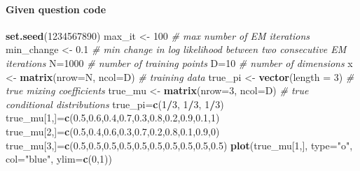 \documentclass[]{article}
\newenvironment{Shaded}{\begin{snugshade}}{\end{snugshade}}
\newcommand{\KeywordTok}[1]{\textcolor[rgb]{0.13,0.29,0.53}{\textbf{#1}}}
\newcommand{\DataTypeTok}[1]{\textcolor[rgb]{0.13,0.29,0.53}{#1}}
\newcommand{\DecValTok}[1]{\textcolor[rgb]{0.00,0.00,0.81}{#1}}
\newcommand{\FloatTok}[1]{\textcolor[rgb]{0.00,0.00,0.81}{#1}}
\newcommand{\StringTok}[1]{\textcolor[rgb]{0.31,0.60,0.02}{#1}}
\newcommand{\CommentTok}[1]{\textcolor[rgb]{0.56,0.35,0.01}{\textit{#1}}}
\newcommand{\OperatorTok}[1]{\textcolor[rgb]{0.81,0.36,0.00}{\textbf{#1}}}
\newcommand{\NormalTok}[1]{#1}
\let\oldparagraph\paragraph
\renewcommand{\paragraph}[1]{\oldparagraph{#1}\mbox{}}
\begin{document}
\paragraph{Given question code}\label{given-question-code}

\begin{Shaded}
\begin{Highlighting}[]
\KeywordTok{set.seed}\NormalTok{(}\DecValTok{1234567890}\NormalTok{)}
\NormalTok{max_it <-}\StringTok{ }\DecValTok{100} \CommentTok{# max number of EM iterations}
\NormalTok{min_change <-}\StringTok{ }\FloatTok{0.1} \CommentTok{# min change in log likelihood between two consecutive EM iterations}
\NormalTok{N=}\DecValTok{1000} \CommentTok{# number of training points}
\NormalTok{D=}\DecValTok{10} \CommentTok{# number of dimensions}
\NormalTok{x <-}\StringTok{ }\KeywordTok{matrix}\NormalTok{(}\DataTypeTok{nrow=}\NormalTok{N, }\DataTypeTok{ncol=}\NormalTok{D) }\CommentTok{# training data}
\NormalTok{true_pi <-}\StringTok{ }\KeywordTok{vector}\NormalTok{(}\DataTypeTok{length =} \DecValTok{3}\NormalTok{) }\CommentTok{# true mixing coefficients}
\NormalTok{true_mu <-}\StringTok{ }\KeywordTok{matrix}\NormalTok{(}\DataTypeTok{nrow=}\DecValTok{3}\NormalTok{, }\DataTypeTok{ncol=}\NormalTok{D) }\CommentTok{# true conditional distributions}
\NormalTok{true_pi=}\KeywordTok{c}\NormalTok{(}\DecValTok{1}\OperatorTok{/}\DecValTok{3}\NormalTok{, }\DecValTok{1}\OperatorTok{/}\DecValTok{3}\NormalTok{, }\DecValTok{1}\OperatorTok{/}\DecValTok{3}\NormalTok{)}
\NormalTok{true_mu[}\DecValTok{1}\NormalTok{,]=}\KeywordTok{c}\NormalTok{(}\FloatTok{0.5}\NormalTok{,}\FloatTok{0.6}\NormalTok{,}\FloatTok{0.4}\NormalTok{,}\FloatTok{0.7}\NormalTok{,}\FloatTok{0.3}\NormalTok{,}\FloatTok{0.8}\NormalTok{,}\FloatTok{0.2}\NormalTok{,}\FloatTok{0.9}\NormalTok{,}\FloatTok{0.1}\NormalTok{,}\DecValTok{1}\NormalTok{)}
\NormalTok{true_mu[}\DecValTok{2}\NormalTok{,]=}\KeywordTok{c}\NormalTok{(}\FloatTok{0.5}\NormalTok{,}\FloatTok{0.4}\NormalTok{,}\FloatTok{0.6}\NormalTok{,}\FloatTok{0.3}\NormalTok{,}\FloatTok{0.7}\NormalTok{,}\FloatTok{0.2}\NormalTok{,}\FloatTok{0.8}\NormalTok{,}\FloatTok{0.1}\NormalTok{,}\FloatTok{0.9}\NormalTok{,}\DecValTok{0}\NormalTok{)}
\NormalTok{true_mu[}\DecValTok{3}\NormalTok{,]=}\KeywordTok{c}\NormalTok{(}\FloatTok{0.5}\NormalTok{,}\FloatTok{0.5}\NormalTok{,}\FloatTok{0.5}\NormalTok{,}\FloatTok{0.5}\NormalTok{,}\FloatTok{0.5}\NormalTok{,}\FloatTok{0.5}\NormalTok{,}\FloatTok{0.5}\NormalTok{,}\FloatTok{0.5}\NormalTok{,}\FloatTok{0.5}\NormalTok{,}\FloatTok{0.5}\NormalTok{)}
\KeywordTok{plot}\NormalTok{(true_mu[}\DecValTok{1}\NormalTok{,], }\DataTypeTok{type=}\StringTok{"o"}\NormalTok{, }\DataTypeTok{col=}\StringTok{"blue"}\NormalTok{, }\DataTypeTok{ylim=}\KeywordTok{c}\NormalTok{(}\DecValTok{0}\NormalTok{,}\DecValTok{1}\NormalTok{))}

\end{Highlighting}
\end{Shaded}
\end{document}
